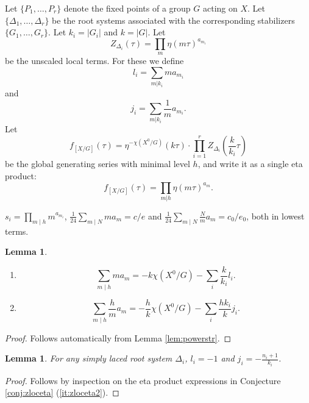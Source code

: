 \documentclass[11pt,a4paper]{amsart}
\newtheorem{lemma}[theorem]{Lemma}
\theoremstyle{definition}
\begin{document}
Let $\{P_1,\dots,P_r\}$ denote the fixed points of a group $G$ acting on $X$. Let $\{ \Delta_1, \dots, \Delta_r \}$ be the  root systems associated with the corresponding stabilizers $\{ G_1,\dots,G_r \}$. Let $k_i=|G_i|$ and $k=|G|$. Let 
\[Z_{\Delta_i}(\tau)=\prod_m \eta(m \tau )^{a_{m_i}}\] be the unscaled local terms. For these we define 
\[ l_{i}= \sum_{m|k_i}ma_{m_i} \]
and
\[ j_{i}= \sum_{m|k_i}\frac{1}{m}a_{m_i}. \]
Let
\[ f_{[X/G]}(\tau)=\eta^{-\chi(X^0/G)}(k \tau) \cdot \prod_{i=1}^r Z_{\Delta_i}\left(\frac{k}{k_i} \tau\right) \]
be the global generating series with minimal level $h$, and write it as a single eta product:
\[ f_{[X/G]}(\tau)=\prod_{m|h} \eta(m \tau )^{a_{m}}. \]




$s_i=\prod_{m \mid h} m^{a_{m_i}}$,  $\frac{1}{24}\sum_{m \mid N} ma_m=c/e$ and $\frac{1}{24}\sum_{m \mid N} \frac{N}{m}a_m=c_0/e_0$, both in lowest terms.
\begin{lemma}
\label{lem:covpresum} 
\begin{enumerate}
\item\label{it:covpresum1} 
\[ \sum_{m \mid h} ma_m=-k\chi(X^0/G)-\sum_{i}\frac{k}{k_i}l_i. \]
\item\label{it:covpresum2} 
\[ \sum_{m \mid h} \frac{h}{m}a_m=-\frac{h}{k}\chi(X^0/G)-\sum_{i}\frac{hk_i}{k}j_i. \]
	
\end{enumerate}
\end{lemma}
\begin{proof}
Follows automatically from Lemma \ref{lem:powerstr}.
\end{proof}

\begin{lemma} 
\label{lem:liji}
For any simply laced root system $\Delta_i$, $l_i=-1$ and $j_i=-\frac{n_i+1}{k_i}$.
\end{lemma}
\begin{proof}
Follows by inspection on the eta product expressions in Conjecture \ref{conj:zloceta} (\ref{it:zloceta2}).
\end{proof}
\end{document}
